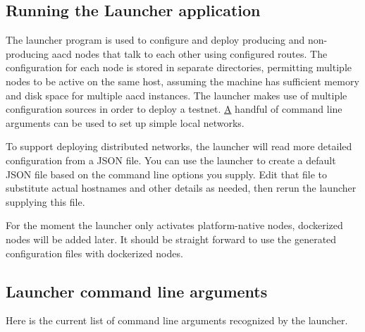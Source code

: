 \subsection*{Running the Launcher application}

The launcher program is used to configure and deploy producing and non-\/producing aacd nodes that talk to each other using configured routes. The configuration for each node is stored in separate directories, permitting multiple nodes to be active on the same host, assuming the machine has sufficient memory and disk space for multiple aacd instances. The launcher makes use of multiple configuration sources in order to deploy a testnet. \mbox{\hyperlink{struct_a}{A}} handful of command line arguments can be used to set up simple local networks.

To support deploying distributed networks, the launcher will read more detailed configuration from a J\+S\+ON file. You can use the launcher to create a default J\+S\+ON file based on the command line options you supply. Edit that file to substitute actual hostnames and other details as needed, then rerun the launcher supplying this file.

For the moment the launcher only activates platform-\/native nodes, dockerized nodes will be added later. It should be straight forward to use the generated configuration files with dockerized nodes.

\subsection*{Launcher command line arguments}

Here is the current list of command line arguments recognized by the launcher.


